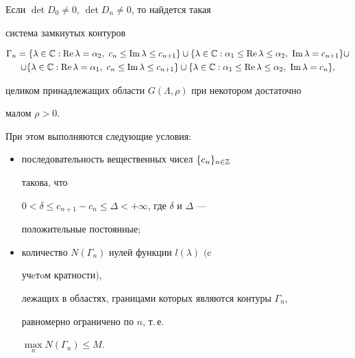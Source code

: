 \begin{lem} 


Если $\det D_0\ne0$, $\det D_n\ne0$, то найдется такая 


система замкнутых контуров 


\begin{multline*} 


\Gamma_n=\{\lambda\in\Bbb C:\re\lambda=\alpha_2,\ c_n\le\im\lambda 


\le c_{n+1}\}\cup \{\lambda\in\Bbb C:\alpha_1\le\re\lambda\le 


\alpha_2,\ \im\lambda=c_{n+1}\}\cup \\ 


% 


\cup\{\lambda\in\Bbb C:\re\lambda=\alpha_1, \ c_n\le 


\im\lambda\le c_{n+1}\}\cup\{\lambda\in\Bbb C: 


\alpha_1\le\re\lambda\le\alpha_2,\ \im\lambda=c_n\}, 


\end{multline*} 


целиком принадлежащих области $G(\Lambda,\rho)$ при некотором достаточно 


малом $\rho>0$. 


 


При этом выполняются следующие условия\/$:$ 


\begin{itemize} 


\item[(i)] последовательность вещественных чисел $\{c_n\}_{n\in\Bbb Z}$ 


такова, что 


$0<\delta\le c_{n+1}-c_n\le\Delta<+\infty$, где $\delta$ и $\Delta$ --- 


положительные постоянные$;$


\item[(ii)] количество $N(\Gamma_n)$ нулей функции $l(\lambda)$ $($c 


учeтoм кратности$)$, 


лежащих в областях, границами которых являются контуры $\Gamma_n$, 


равномерно ограничено по $n$, т.\,е. 


$\max\limits_n N(\Gamma_n){\le}M$. 


\end{itemize} 


\end{lem} 


